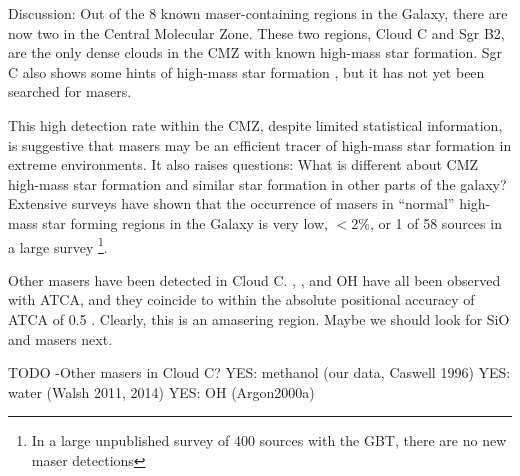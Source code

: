 Discussion:
Out of the 8 known maser-containing regions in the Galaxy, there are now two in
the Central Molecular Zone.  These two regions, Cloud C and Sgr B2, are the only
dense clouds in the CMZ with known high-mass star formation.  Sgr C also shows
some hints of high-mass star formation \citep{Kendrew2013a}, but it has not yet
been searched for \formaldehyde masers.

This high detection rate within the CMZ, despite limited statistical
information, is suggestive that \formaldehyde masers may be an efficient tracer
of high-mass star formation in extreme environments.
It also raises questions: What is different about CMZ high-mass star formation and
similar star formation in other parts of the galaxy?  Extensive surveys have shown
that the occurrence of \formaldehyde masers in ``normal'' high-mass star
forming regions in the Galaxy is very low, $<2\%$, or 1 of 58 sources in a
large survey \citep{Araya2004a,Araya2007b,Araya2008a}\footnote{In a large unpublished survey
of 400 sources with the GBT, there are no new maser detections}.  

Other masers have been detected in Cloud C.  \methanol, \water, and OH have all
been observed with ATCA, and they coincide to within the absolute positional
accuracy of ATCA of 0.5\arcsec
\citep[][respectively]{Caswell2010a,Walsh2014a,Argon2000a}.  Clearly, this is
an amasering region.  Maybe we should look for SiO and \ammonia masers next.

TODO
-Other masers in Cloud C?
  YES: methanol (our data, Caswell 1996)
  YES: water (Walsh 2011, 2014)
  YES: OH (Argon2000a)
